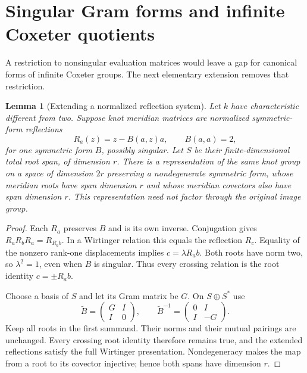 \documentclass[11pt]{article}
\newtheorem{lemma}[theorem]{Lemma}
\begin{document}
\section{Singular Gram forms and infinite Coxeter quotients}

A restriction to nonsingular evaluation matrices would leave a gap for
canonical forms of infinite Coxeter groups. The next elementary
extension removes that restriction.

\begin{lemma}[Extending a normalized reflection system]\label{lem:lift}
Let $k$ have characteristic different from two. Suppose knot meridian
matrices are normalized symmetric-form reflections
\[
 R_a(z)=z-B(a,z)a,\qquad B(a,a)=2,
\]
for one symmetric form $B$, possibly singular. Let $S$ be their
finite-dimensional total root span, of dimension $r$. There is a
representation of the same knot group on a space of dimension $2r$
preserving a nondegenerate symmetric form, whose meridian roots have
span dimension $r$ and whose meridian covectors also have span
dimension $r$. This representation need not factor through the
original image group.
\end{lemma}
\begin{proof}
Each $R_a$ preserves $B$ and is its own inverse. Conjugation gives
$R_aR_bR_a=R_{R_ab}$. In a Wirtinger relation this equals the
reflection $R_c$. Equality of the nonzero rank-one displacements
implies $c=\lambda R_ab$. Both roots have norm two, so $\lambda^2=1$,
even when $B$ is singular. Thus every crossing relation is the root
identity $c=\pm R_ab$.

Choose a basis of $S$ and let its Gram matrix be $G$. On $S\oplus S^*$
use
\[
 \widetilde B=\begin{pmatrix}G&I\\I&0\end{pmatrix},\qquad
 \widetilde B^{-1}=\begin{pmatrix}0&I\\I&-G\end{pmatrix}.
\]
Keep all roots in the first summand. Their norms and their mutual
pairings are unchanged. Every crossing root identity therefore
remains true, and the extended reflections satisfy the full
Wirtinger presentation. Nondegeneracy makes the map from a root to
its covector injective; hence both spans have dimension $r$.
\end{proof}
\end{document}
